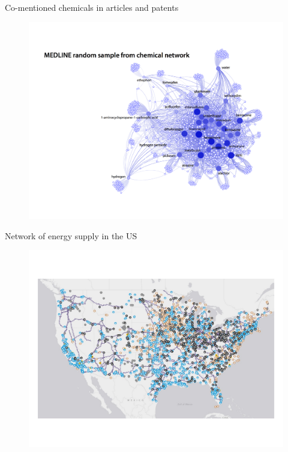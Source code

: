 \documentclass[10pt]{beamer}
\begin{document}
\begin{frame}{Co-mentioned chemicals in articles and patents}
	\begin{figure}
	\centering
	\includegraphics[scale=0.4]{Figs/chem}
	\end{figure}
\end{frame}

\begin{frame}{Network of energy supply in the US}
	\begin{figure}
	\centering
	\includegraphics[scale=0.43]{Figs/power}
	\end{figure}
\end{frame}
\end{document}
